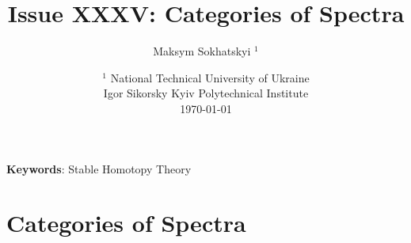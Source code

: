 \documentclass{article}
\begin{document}
\title{Issue XXXV: Categories of Spectra}
\author{Maksym Sokhatskyi $^1$}
\date{ $^1$ National Technical University of Ukraine \\
       \small Igor Sikorsky Kyiv Polytechnical Institute \\
       \today }

\maketitle

\begin{abstract}
\end{abstract}

{\bf Keywords}: Stable Homotopy Theory

\ifincludeTOC
  \tableofcontents
\fi

\section{Categories of Spectra}
\end{document}

